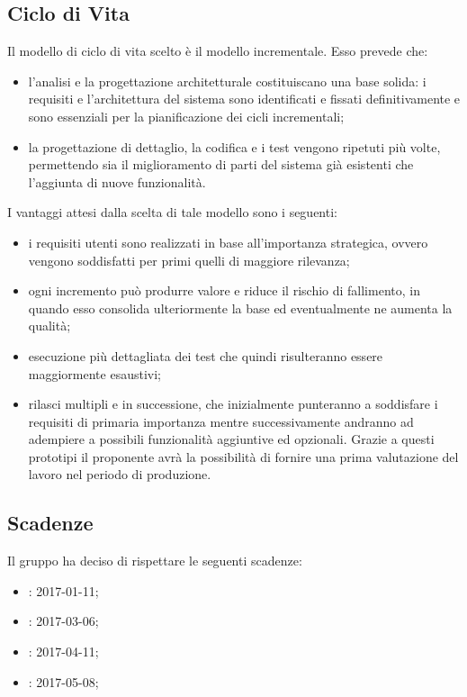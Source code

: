 	    \subsection{Ciclo di Vita}
	    Il modello di ciclo di vita scelto è il modello incrementale. Esso prevede che:
	    \begin{itemize}
	    	\item l'analisi e la progettazione architetturale costituiscano una base solida: i requisiti e l'architettura del sistema sono identificati e fissati definitivamente e sono essenziali per la pianificazione dei cicli incrementali;
	    	\item la progettazione di dettaglio, la codifica e i test vengono ripetuti più volte, permettendo sia il miglioramento di parti del sistema già esistenti che l'aggiunta di nuove funzionalità.
	    \end{itemize}
	    I vantaggi attesi dalla scelta di tale modello sono i seguenti:
	    \begin{itemize}
	    	\item i requisiti utenti sono realizzati in base all'importanza strategica, ovvero vengono soddisfatti per primi quelli di maggiore rilevanza;
	    	\item ogni incremento può produrre valore e riduce il rischio di fallimento, in quando esso consolida ulteriormente la base ed eventualmente ne aumenta la qualità;
	    	\item esecuzione più dettagliata dei test che quindi risulteranno essere maggiormente esaustivi;
	    	\item rilasci multipli e in successione, che inizialmente punteranno a soddisfare i requisiti di primaria importanza mentre successivamente andranno ad adempiere a possibili funzionalità aggiuntive ed opzionali. Grazie a questi prototipi il proponente avrà la possibilità di fornire una prima valutazione del lavoro nel periodo di produzione.
	    \end{itemize}
	    \subsection{Scadenze}
	    Il gruppo \AUTORE{} ha deciso di rispettare le seguenti scadenze:
	    \begin{itemize}
			\item \RR{}: 2017-01-11;
			\item \RP{}: 2017-03-06;
			\item \RQ{}: 2017-04-11;
			\item \RA{}: 2017-05-08;
	    \end{itemize}
